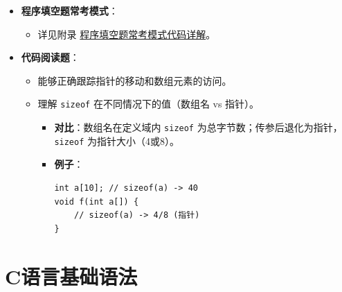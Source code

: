 \documentclass[a4paper,12pt]{article}
\begin{document}
\begin{itemize}
\begin{itemize}
\begin{itemize}
            \item \textbf{例子}：
\begin{lstlisting}
// 指针数组
char *strs[3] = {"A", "B", "C"};
// 数组指针
int arr[10];
int (*p)[10] = &arr;
\end{lstlisting}
        \end{itemize}
        \item \textbf{作用域}：局部变量屏蔽同名全局变量。
        \begin{itemize}
            \item \textbf{辨析}：同名时，谁近用谁（局部优先）。
            \item \textbf{例子}：
\begin{lstlisting}
int x = 10;
void f() {
    int x = 5;
    printf("%d", x); // 输出 5
}
\end{lstlisting}
        \end{itemize}
    \end{itemize}
    \item \textbf{程序填空题常考模式}：
    \begin{itemize}
        \item 详见附录 \hyperref[sec:appendix_code]{程序填空题常考模式代码详解}。
    \end{itemize}
    \item \textbf{代码阅读题}：
    \begin{itemize}
        \item 能够正确跟踪指针的移动和数组元素的访问。
        \item 理解 \texttt{sizeof} 在不同情况下的值（数组名 vs 指针）。
        \begin{itemize}
            \item \textbf{对比}：数组名在定义域内 \texttt{sizeof} 为总字节数；传参后退化为指针，\texttt{sizeof} 为指针大小（4或8）。
            \item \textbf{例子}：
\begin{lstlisting}
int a[10]; // sizeof(a) -> 40
void f(int a[]) {
    // sizeof(a) -> 4/8 (指针)
}
\end{lstlisting}
        \end{itemize}
    \end{itemize}
\end{itemize}

\section{C语言基础语法}
\end{document}
